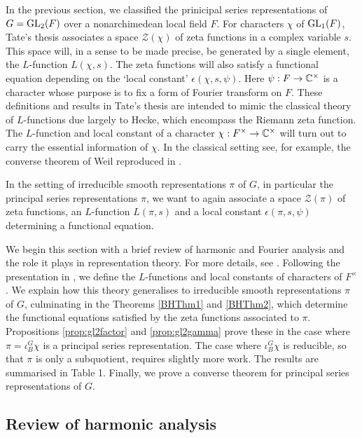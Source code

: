 In the previous section, we classified the prinicipal series representations of $G=\mathrm{GL}_2(F)$ over a nonarchimedean local field $F$. For characters $\chi$ of $\mathrm{GL}_1(F)$, Tate's thesis \cite{Tate} associates a space $\mathcal Z(\chi)$ of zeta functions in a complex variable $s$. This space will, in a sense to be made precise, be generated by a single element, the $L$-function $L(\chi,s)$. The zeta functions will also satisfy a functional equation depending on the `local constant' $\epsilon(\chi,s,\psi)$. Here $\psi :F \to \mathbb{C}^\times$ is a character whose purpose is to fix a form of Fourier transform on $F$. These definitions and results in Tate's thesis are intended to mimic the classical theory of $L$-functions due largely to Hecke, which encompass the Riemann zeta function. The $L$-function and local constant of a character $\chi:F^\times \to \mathbb{C}^\times$ will turn out to carry the essential information of $\chi$. In the classical setting see, for example, the converse theorem of Weil reproduced in \cite[Theorem 1.5.1]{Bump}.

In the setting of irreducible smooth representations $\pi$ of $G$, in particular the principal series representations $\pi$, we want to again associate a space $\mathcal Z(\pi)$ of zeta functions, an $L$-function $L(\pi,s)$ and a local constant $\epsilon(\pi,s,\psi)$ determining a functional equation. 

We begin this section with a brief review of harmonic and Fourier analysis and the role it plays in representation theory. For more details, see \cite[Chapter 3.1]{Bump}. Following the presentation in \cite{GH1}, we define the $L$-functions and local constants of characters of $F^\times$. We explain how this theory generalises to irreducible smooth representations $\pi$ of $G$, culminating in the Theorems \ref{BHThm1} and \ref{BHThm2}, which determine the functional equations satisfied by the zeta functions associated to $\pi$. Propositions \ref{prop:gl2factor} and \ref{prop:gl2gamma} prove these in the case where $\pi = \iota_B^G \chi$ is a principal series representation. The case where $\iota_B^G \chi$ is reducible, so that $\pi$ is only a subquotient, requires slightly more work. The results are summarised in Table 1. Finally, we prove a converse theorem for principal series representations of $G$.


\subsection{Review of harmonic analysis}

